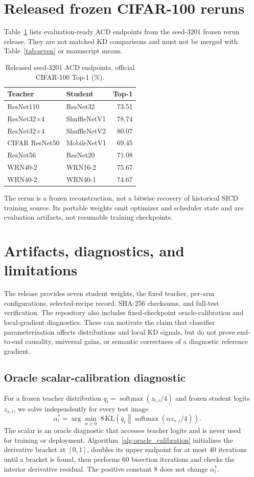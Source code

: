 \documentclass[10pt]{article}
\newcommand{\KL}{\mathrm{KL}}
\begin{document}
\section{Released frozen CIFAR-100 reruns}
Table~\ref{tab:reruns} lists evaluation-ready ACD endpoints from the seed-3201 frozen rerun release. They are not matched KD comparisons and must not be merged with Table~\ref{tab:seven} or manuscript means.
\begin{table}[h]
\centering
\caption{Released seed-3201 ACD endpoints, official CIFAR-100 Top-1 (\%).}
\label{tab:reruns}
\begin{tabular}{llr}
\toprule
Teacher & Student & Top-1 \\
\midrule
ResNet110 & ResNet32 & 73.51 \\
ResNet32$\times$4 & ShuffleNetV1 & 78.74 \\
ResNet32$\times$4 & ShuffleNetV2 & 80.07 \\
CIFAR ResNet50 & MobileNetV1 & 69.45 \\
ResNet56 & ResNet20 & 71.08 \\
WRN40-2 & WRN16-2 & 75.67 \\
WRN40-2 & WRN40-1 & 74.67 \\
\bottomrule
\end{tabular}
\end{table}
The rerun is a frozen reconstruction, not a bitwise recovery of historical SICD training source. Its portable weights omit optimizer and scheduler state and are evaluation artifacts, not resumable training checkpoints.

\section{Artifacts, diagnostics, and limitations}
The release provides seven student weights, the fixed teacher, per-arm configurations, selected-recipe record, SHA-256 checksums, and full-test verification. The repository also includes fixed-checkpoint oracle-calibration and local-gradient diagnostics. These can motivate the claim that classifier parameterization affects distributions and local KD signals, but do not prove end-to-end causality, universal gains, or semantic correctness of a diagnostic reference gradient.

\subsection{Oracle scalar-calibration diagnostic}
For a frozen teacher distribution $q_i=\operatorname{softmax}(z_{t,i}/4)$ and frozen student logits $z_{s,i}$, we solve independently for every test image
\begin{equation}
 \alpha_i^*=\arg\min_{\alpha\geq0}\;8\,\KL\!\left(q_i\middle\|\operatorname{softmax}(\alpha z_{s,i}/4)\right).
\end{equation}
The scalar is an oracle diagnostic that accesses teacher logits and is never used for training or deployment. Algorithm~\ref{alg:oracle_calibration} initializes the derivative bracket at $[0,1]$, doubles its upper endpoint for at most 40 iterations until a bracket is found, then performs 60 bisection iterations and checks the interior derivative residual. The positive constant 8 does not change $\alpha_i^*$.
\end{document}

